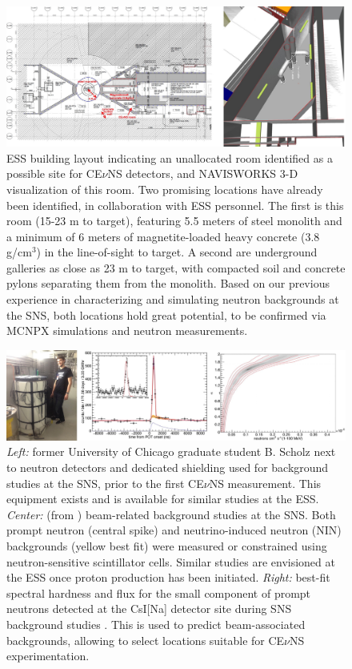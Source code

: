 \begin{figure}[htb!]
\begin{center}
\includegraphics[width=5.7in]{fig4.pdf}
\caption{\label{fig:fig4} \scriptsize ESS building layout indicating an unallocated room  identified as a possible site for CE$\nu$NS detectors, and NAVISWORKS 3-D visualization of this room. Two promising locations have already been identified, in collaboration with ESS personnel. The first is this room (15-23 m to target), featuring 5.5 meters of steel monolith and a minimum of 6 meters of magnetite-loaded  heavy  concrete  (3.8 g/cm$^{3}$) in  the  line-of-sight to target.  A second are underground galleries as close as 23 m to target, with compacted soil and concrete pylons separating them from the  monolith. Based on our previous experience in characterizing and simulating neutron backgrounds at the SNS, both locations hold great potential, to be confirmed via MCNPX simulations and neutron measurements. }
\end{center}
\end{figure}

\begin{figure}[htb!]
\begin{center}
\includegraphics[width=6.2in]{fig5.pdf}
\caption{\label{fig:fig5} \scriptsize {\it Left: }  former University of Chicago graduate student B. Scholz next to neutron detectors and dedicated shielding used for background studies at the SNS, prior to the first CE$\nu$NS measurement. This equipment exists and is available for similar studies at the ESS.  {\it Center:} (from \cite{science,bjorn}) beam-related background studies at the SNS. Both prompt neutron (central spike) and neutrino-induced neutron (NIN) backgrounds (yellow best fit) were measured or constrained using neutron-sensitive  scintillator cells. Similar studies are envisioned at the ESS once proton production has been initiated. {\it Right:} best-fit spectral hardness and flux for the small component of prompt neutrons detected at the CsI[Na] detector site during SNS background studies \cite{science,bjorn}. This is used to predict beam-associated backgrounds, allowing to select locations suitable for CE$\nu$NS experimentation. }
\end{center}
\end{figure}


